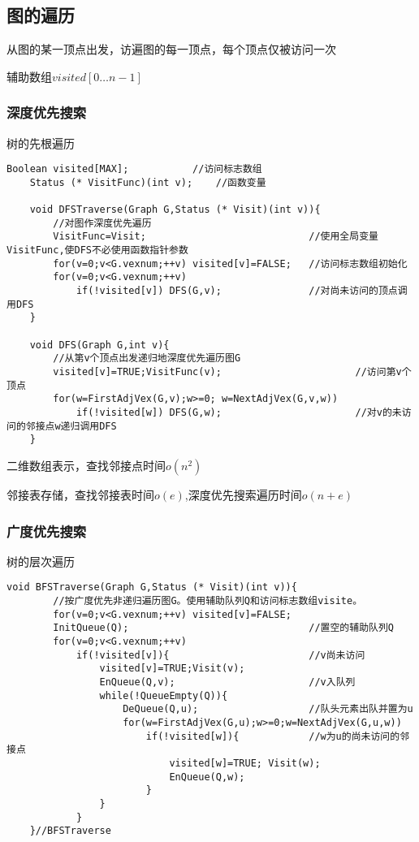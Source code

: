 \documentclass[UTF8]{ctexart}
\begin{document}
\subsection{图的遍历}

从图的某一顶点出发，访遍图的每一顶点，每个顶点仅被访问一次

辅助数组$visited[0 \dots n-1]$

\subsubsection{深度优先搜索}

树的先根遍历

\begin{lstlisting}[style=v1] 
    Boolean visited[MAX];           //访问标志数组
    Status (* VisitFunc)(int v);    //函数变量

    void DFSTraverse(Graph G,Status (* Visit)(int v)){
        //对图作深度优先遍历
        VisitFunc=Visit;                            //使用全局变量VisitFunc,使DFS不必使用函数指针参数
        for(v=0;v<G.vexnum;++v) visited[v]=FALSE;   //访问标志数组初始化
        for(v=0;v<G.vexnum;++v) 
            if(!visited[v]) DFS(G,v);               //对尚未访问的顶点调用DFS
    }

    void DFS(Graph G,int v){
        //从第v个顶点出发递归地深度优先遍历图G
        visited[v]=TRUE;VisitFunc(v);                       //访问第v个顶点
        for(w=FirstAdjVex(G,v);w>=0; w=NextAdjVex(G,v,w))
            if(!visited[w]) DFS(G,w);                       //对v的未访问的邻接点w递归调用DFS
    }

\end{lstlisting}

二维数组表示，查找邻接点时间$o(n^2)$

邻接表存储，查找邻接表时间$o(e)$,深度优先搜索遍历时间$o(n+e)$
 

\newpage

\subsubsection{广度优先搜索}

树的层次遍历

\begin{lstlisting}[style=v1]
    void BFSTraverse(Graph G,Status (* Visit)(int v)){
        //按广度优先非递归遍历图G。使用辅助队列Q和访问标志数组visite。
        for(v=0;v<G.vexnum;++v) visited[v]=FALSE;
        InitQueue(Q);                               //置空的辅助队列Q
        for(v=0;v<G.vexnum;++v)
            if(!visited[v]){                        //v尚未访问
                visited[v]=TRUE;Visit(v);
                EnQueue(Q,v);                       //v入队列
                while(!QueueEmpty(Q)){
                    DeQueue(Q,u);                   //队头元素出队并置为u
                    for(w=FirstAdjVex(G,u);w>=0;w=NextAdjVex(G,u,w))
                        if(!visited[w]){            //w为u的尚未访问的邻接点
                            visited[w]=TRUE; Visit(w);
                            EnQueue(Q,w);
                        }
                }
            }
    }//BFSTraverse
\end{lstlisting}
 
\end{document}
